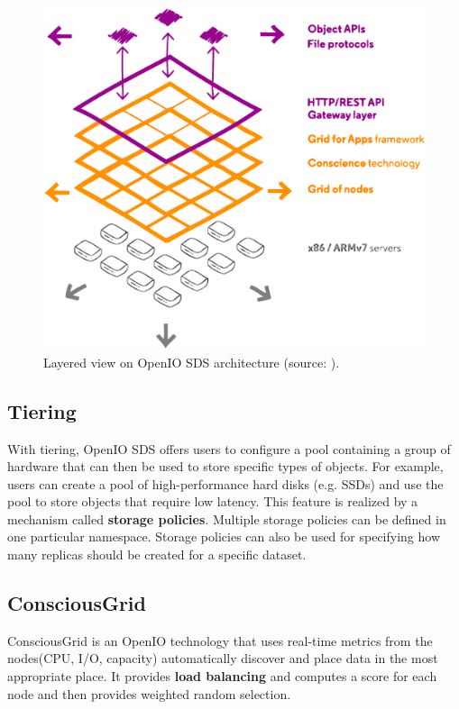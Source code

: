     \begin{figure}[H]
        \centering
        \includegraphics[width=1\textwidth]{obrazky-figures/openio-architecture.eps}
        \caption{Layered view on OpenIO SDS architecture (source: \cite{oioArch}).}
        \label{fig:oioArch}
    \end{figure}


    \subsection*{Tiering}
    With tiering, OpenIO SDS offers users to configure a pool containing a group of hardware that can then be used to store specific types of objects. For example, users can create a pool of high-performance hard disks (e.g. SSDs) and use the pool to store objects that require low latency.
    This feature is realized by a mechanism called \textbf{storage policies}. Multiple storage policies can be defined in one particular namespace. Storage policies can also be used for specifying how many replicas should be created for a specific dataset\cite{oioCoreSolution}.

    \subsection*{ConsciousGrid}
    ConsciousGrid is an OpenIO technology that uses real-time metrics from the nodes(CPU, I/O, capacity) automatically discover and place data in the most appropriate place. It provides \textbf{load balancing} and computes a score for each node and then provides weighted random selection\cite{oioSdsServices}.


